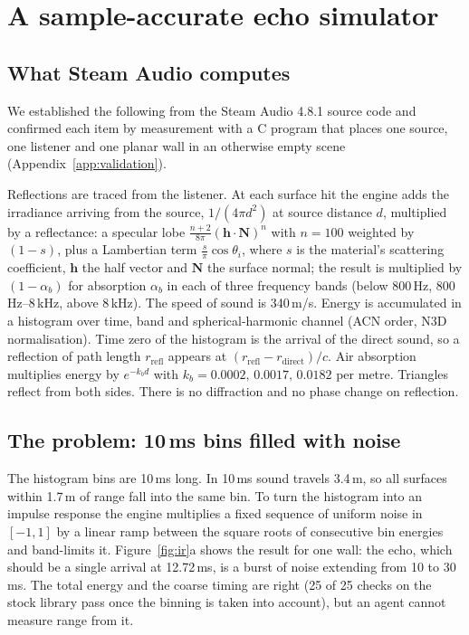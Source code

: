 \documentclass[10pt]{article}
\begin{document}
\section{A sample-accurate echo simulator}
\label{sec:sim}

\subsection{What Steam Audio computes}
We established the following from the Steam Audio 4.8.1 source code and confirmed each item by measurement with a C program that places one source, one listener and one planar wall in an otherwise empty scene (Appendix~\ref{app:validation}).

Reflections are traced from the listener. At each surface hit the engine adds the irradiance arriving from the source, $1/(4\pi d^2)$ at source distance $d$, multiplied by a reflectance: a specular lobe $\frac{n+2}{8\pi}(\mathbf h\!\cdot\!\mathbf N)^n$ with $n=100$ weighted by $(1-s)$, plus a Lambertian term $\frac{s}{\pi}\cos\theta_i$, where $s$ is the material's scattering coefficient, $\mathbf h$ the half vector and $\mathbf N$ the surface normal; the result is multiplied by $(1-\alpha_b)$ for absorption $\alpha_b$ in each of three frequency bands (below 800\,Hz, 800\,Hz--8\,kHz, above 8\,kHz). The speed of sound is 340\,m/s. Energy is accumulated in a histogram over time, band and spherical-harmonic channel (ACN order, N3D normalisation). Time zero of the histogram is the arrival of the direct sound, so a reflection of path length $r_\text{refl}$ appears at $(r_\text{refl}-r_\text{direct})/c$. Air absorption multiplies energy by $e^{-k_b d}$ with $k_b = 0.0002,\,0.0017,\,0.0182$ per metre. Triangles reflect from both sides. There is no diffraction and no phase change on reflection.

\subsection{The problem: 10\,ms bins filled with noise}
The histogram bins are 10\,ms long. In 10\,ms sound travels 3.4\,m, so all surfaces within 1.7\,m of range fall into the same bin. To turn the histogram into an impulse response the engine multiplies a fixed sequence of uniform noise in $[-1,1]$ by a linear ramp between the square roots of consecutive bin energies and band-limits it. Figure~\ref{fig:ir}a shows the result for one wall: the echo, which should be a single arrival at 12.72\,ms, is a burst of noise extending from 10 to 30\,ms. The total energy and the coarse timing are right (25 of 25 checks on the stock library pass once the binning is taken into account), but an agent cannot measure range from it.
\end{document}
